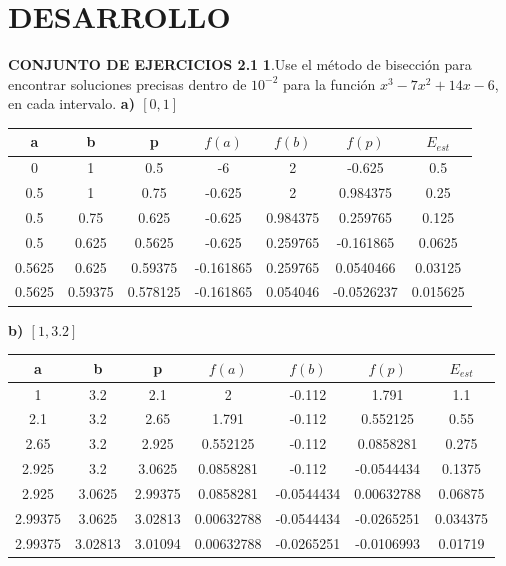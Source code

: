 \documentclass[12pt]{article}
\begin{document}
\section*{DESARROLLO}
\large\textbf{CONJUNTO DE EJERCICIOS 2.1}
\normalsize\newline
\textbf{1}.Use el método de bisección para encontrar soluciones precisas dentro de $10^{-2}$ para la función $x^3 -7x^2 +14x-6$, en cada intervalo.
\newline\textbf{a) $[0, 1]$}
\begin{center}
    \begin{tabular}{|c|c|c|c|c|c|c|}
        \hline
        a & b&p&$f(a)$&$f(b)$&$f(p)$&$E_{est}$\\
        \hline
        0 & 1&  0.5& -6& 2& -0.625& 0.5\\
        0.5 & 1&  0.75& -0.625& 2& 0.984375& 0.25\\
        0.5 & 0.75&  0.625& -0.625& 0.984375& 0.259765& 0.125\\
        0.5 & 0.625&  0.5625& -0.625& 0.259765& -0.161865& 0.0625\\
        0.5625 & 0.625&  0.59375& -0.161865& 0.259765& 0.0540466& 0.03125\\
        0.5625 & 0.59375&  0.578125& -0.161865& 0.054046& -0.0526237& 0.015625\\
        \hline
      \end{tabular} 
\end{center}


\textbf{b) $[1, 3.2]$}
\begin{center}
    \begin{tabular}{|c|c|c|c|c|c|c|}
        \hline
        a & b&p&$f(a)$&$f(b)$&$f(p)$&$E_{est}$\\
        \hline
        1       & 3.2      &  2.1    &  2       & -0.112  & 1.791    & 1.1\\
        2.1     & 3.2     &  2.65    & 1.791    & -0.112  & 0.552125  & 0.55\\
        2.65    & 3.2   &  2.925     & 0.552125   & -0.112  & 0.0858281  & 0.275\\
        2.925   & 3.2  &  3.0625     & 0.0858281   & -0.112& -0.0544434 & 0.1375\\
        2.925   & 3.0625  &  2.99375 & 0.0858281& -0.0544434& 0.00632788 & 0.06875\\
        2.99375 & 3.0625&  3.02813   & 0.00632788& -0.0544434& -0.0265251& 0.034375\\
        2.99375 & 3.02813&  3.01094  & 0.00632788& -0.0265251& -0.0106993& 0.01719\\
        \hline
      \end{tabular} 
\end{center}
\end{document}
